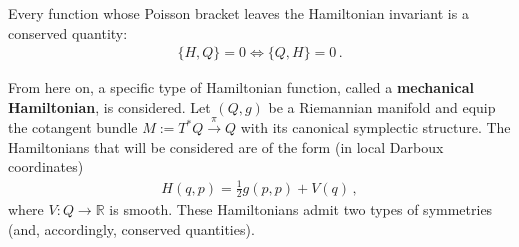     \begin{theorem}[Noether]\label{symplectic:noether}
        Every function whose Poisson bracket leaves the Hamiltonian invariant is a conserved quantity:
        \begin{gather}
            \{H,Q\} = 0\iff\{Q,H\} = 0\,.
        \end{gather}
    \end{theorem}

    From here on, a specific type of Hamiltonian function, called a \textbf{mechanical Hamiltonian}, is considered. Let $(Q,g)$ be a Riemannian manifold and equip the cotangent bundle $M:=T^*Q\overset{\pi}{\rightarrow}Q$ with its canonical symplectic structure. The Hamiltonians that will be considered are of the form (in local Darboux coordinates)
    \begin{gather}
        H(q,p) = \frac{1}{2}g(p,p) + V(q)\,,
    \end{gather}
    where $V:Q\rightarrow\mathbb{R}$ is smooth. These Hamiltonians admit two types of symmetries (and, accordingly, conserved quantities).

